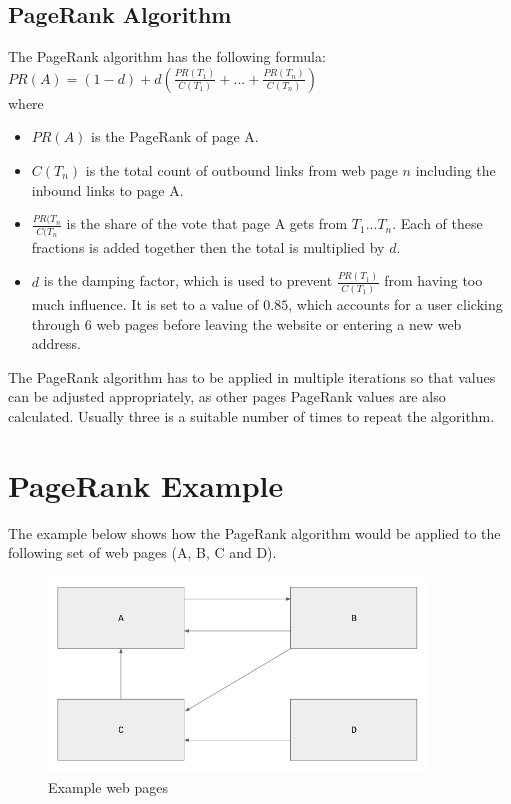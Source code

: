 \documentclass[a4paper,11pt]{article}
\begin{document}
\begin{multicols}{2}
\section{PageRank Algorithm}
The PageRank algorithm has the following formula:\\
$\displaystyle PR(A) = (1-d) + d \left(\displaystyle \frac{PR(T_1)}{C(T_1)} + ... + \frac{PR(T_n)}{C(T_n)} \right)$\\
where
\begin{itemize}
    \item $PR(A)$ is the PageRank of page A.
    \item $C(T_n)$ is the total count of outbound links from web page $n$ including the inbound links to page A. 
    \item $\frac{PR(T_n}{C(T_n}$ is the share of the vote that page A gets from $T_1 ... T_n$. Each of these fractions is added together then the total is multiplied by $d$.
    \item $d$ is the damping factor, which is used to prevent $\frac{PR(T_1)}{C(T_1)}$ from having too much influence. It is set to a value of $0.85$, which accounts for a user clicking through 6 web pages before leaving the website or entering a new web address.
\end{itemize}
The PageRank algorithm has to be applied in multiple iterations so that values can be adjusted appropriately, as other pages PageRank values are also calculated. Usually three is a suitable number of times to repeat the algorithm.
\end{multicols}
\section{PageRank Example}
The example below shows how the PageRank algorithm would be applied to the following set of web pages (A, B, C and D).
\begin{figure}[H]
    \centering
    \includegraphics[width=0.9\textwidth]{images/PageRankExample.png}
    \caption{Example web pages}
    \label{fig:pageRankExample}
\end{figure}
\end{document}
